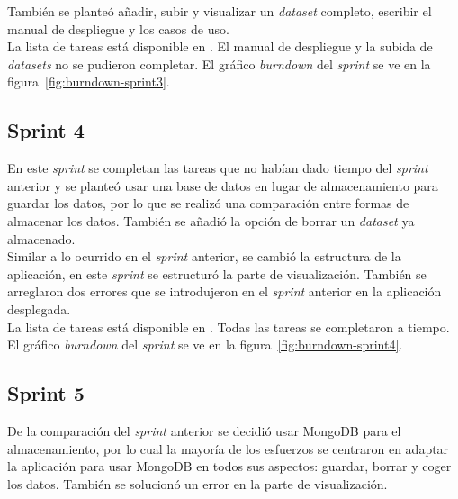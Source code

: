 También se planteó añadir, subir y visualizar un \textit{dataset} completo,
escribir el manual de despliegue y los casos de uso.\\

La lista de tareas está disponible en
. El manual de despliegue y la subida de \textit{datasets} no se pudieron
completar. El gráfico \textit{burndown} del \textit{sprint} se ve en la
figura~\ref{fig:burndown-sprint3}.\\


\subsection{Sprint 4}
En este \textit{sprint} se completan las tareas que no habían dado tiempo del
\textit{sprint} anterior y se planteó usar una base de datos en lugar de
almacenamiento para guardar los datos, por lo que se realizó una comparación
entre formas de almacenar los datos. También se añadió la opción de borrar un
\textit{dataset} ya almacenado.\\

Similar a lo ocurrido en el \textit{sprint} anterior, se cambió la estructura 
de la aplicación, en este \textit{sprint} se estructuró la parte de 
visualización. También se arreglaron dos errores que se introdujeron en el
\textit{sprint} anterior en la aplicación desplegada.\\

La lista de tareas está disponible en
. Todas las tareas se completaron a tiempo. El gráfico \textit{burndown} del 
\textit{sprint} se ve en la figura~\ref{fig:burndown-sprint4}.\\


\subsection{Sprint 5}
De la comparación del \textit{sprint} anterior se decidió usar MongoDB para el
almacenamiento, por lo cual la mayoría de los esfuerzos se centraron en adaptar
la aplicación para usar MongoDB en todos sus aspectos: guardar, borrar y coger
los datos. También se solucionó un error en la parte de visualización.\\

